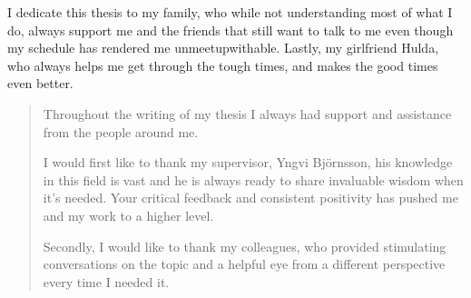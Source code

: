 \frontmatter{} %


\frontrequiredpages{}%


\begin{dedications}
  I dedicate this thesis to my family, who while not understanding most of what I do,
  always support me and the friends that still want to talk to me even though my
  schedule has rendered me unmeetupwithable. Lastly, my girlfriend Hulda, who always helps me get 
  through the tough times, and makes the good times even better.
\end{dedications}

\enableindents{}%
\begin{quotation}
Throughout the writing of my thesis I always had support and assistance from the people around me.

I would first like to thank my supervisor, Yngvi Björnsson, his knowledge in this field is vast and he is always ready to share invaluable wisdom when it's needed. Your critical feedback and consistent positivity has pushed me and my work to a higher level.

Secondly, I would like to thank my colleagues, who provided stimulating conversations on the topic and a helpful eye from a different perspective every time I needed it.

\end{quotation}
\vspace{\baselineskip}


\starttables{}%
\tableofcontents{}\clearpage%
\listoffigures{}\clearpage%
\listoftables{}\clearpage%

